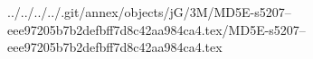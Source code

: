 ../../../../.git/annex/objects/jG/3M/MD5E-s5207--eee97205b7b2defbff7d8c42aa984ca4.tex/MD5E-s5207--eee97205b7b2defbff7d8c42aa984ca4.tex